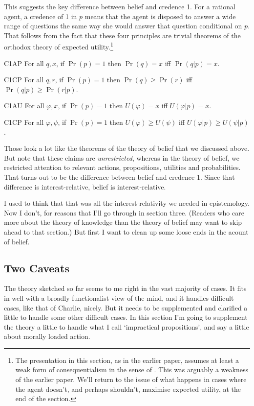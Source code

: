 This suggests the key difference between belief and credence 1. For a rational agent, a credence of 1 in $p$ means that the agent is disposed to answer a wide range of questions the same way she would answer that question conditional on $p$. That follows from the fact that these four principles are trivial theorems of the orthodox theory of expected utility.\footnote{The presentation in this section, as in the earlier paper, assumes at least a weak form of consequentialism in the sense of \cite{Hammond1988}. This was arguably a weakness of the earlier paper. We'll return to the issue of what happens in cases where the agent doesn't, and perhaps shouldn't, maximise expected utility, at the end of the section.} 

\begin{description*}
\item[C1AP] For all $q, x$, if $\Pr(p) = 1$ then $\Pr(q) = x$ iff $\Pr(q | p) = x$.
\item[C1CP] For all $q, r$, if $\Pr(p) = 1$ then $\Pr(q) \geq \Pr(r)$ iff $\Pr(q | p) \geq \Pr(r | p)$.
\item[C1AU] For all $\varphi, x$, if $\Pr(p) = 1$ then $U(\varphi) = x$ iff $U(\varphi | p) = x$.
\item[C1CP] For all $\varphi, \psi$, if $\Pr(p) = 1$ then $U(\varphi) \geq U(\psi)$ iff $U(\varphi | p) \geq U(\psi | p)$.
\end{description*}

\noindent Those look a lot like the theorems of the theory of belief that we discussed above. But note that these claims are \textit{unrestricted}, whereas in the theory of belief, we restricted attention to relevant actions, propositions, utilities and probabilities. That turns out to be the difference between belief and credence 1. Since that difference is interest-relative, belief is interest-relative.

I used to think that that was all the interest-relativity we needed in epistemology. Now I don't, for reasons that I'll go through in section three. (Readers who care more about the theory of knowledge than the theory of belief may want to skip ahead to that section.) But first I want to clean up some loose ends in the acount of belief.

\subsection{Two Caveats}
The theory sketched so far seems to me right in the vast majority of cases. It fits in well with a broadly functionalist view of the mind, and it handles difficult cases, like that of Charlie, nicely. But it needs to be supplemented and clarified a little to handle some other difficult cases. In this section I'm going to supplement the theory a little to handle what I call `impractical propositions', and say a little about morally loaded action.

